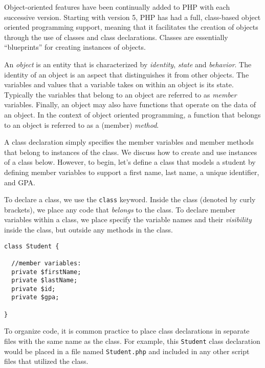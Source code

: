 

Object-oriented features have been continually added to PHP with
each successive version.  Starting with version 5, PHP has had a full,
class-based object oriented programming support, meaning
that it facilitates the creation of objects through the use of classes
and class declarations.  Classes are essentially ``blueprints'' for 
creating instances of objects.  

An \emph{object} is an entity that is characterized by \emph{identity}, 
\emph{state} and \emph{behavior}.  The identity of an object is an
aspect that distinguishes it from other objects.  The variables and
values that a variable takes on within an object is its state.  Typically
the variables that belong to an object are referred to as \emph{member} 
variables.  Finally, an object may also have functions that operate
on the data of an object.  In the context of object oriented programming, 
a function that belongs to an object is referred to as a (member)
\emph{method}.

A class declaration simply specifies the member variables and member 
methods that belong to instances of the
class.  We discuss how to create and use instances of a class below.
However, to begin, let's define a class that models a student by
defining member variables to support a first name, last name, a
unique identifier, and GPA.

To declare a class, we use the \texttt{class} keyword.
Inside the class (denoted by curly brackets), we place any code that
\emph{belongs} to the class.  To declare member variables within
a class, we place specify the variable names and their \emph{visibility}
inside the class, but outside any methods in the class.

\begin{verbatim}
class Student {

  //member variables:
  private $firstName;
  private $lastName;
  private $id;
  private $gpa;

}
\end{verbatim}

To organize code, it is common practice to place class declarations in
separate files with the same name as the class.  For example, this
\texttt{Student} class declaration would be placed in a 
file named \texttt{Student.php} and included in any other
script files that utilized the class.

